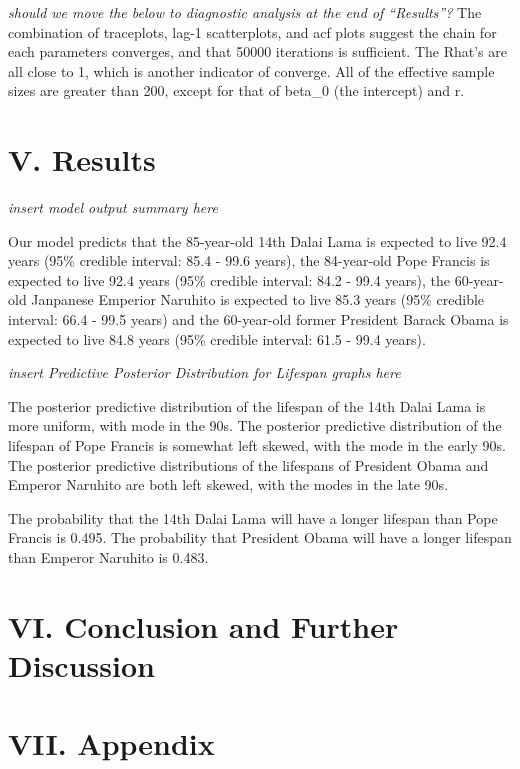 \documentclass[
]{article}
\begin{document}
\emph{should we move the below to diagnostic analysis at the end of
``Results''?} The combination of traceplots, lag-1 scatterplots, and acf
plots suggest the chain for each parameters converges, and that 50000
iterations is sufficient. The Rhat's are all close to 1, which is
another indicator of converge. All of the effective sample sizes are
greater than 200, except for that of beta\_0 (the intercept) and r.

\hypertarget{v.-results}{%
\section{V. Results}\label{v.-results}}

\emph{insert model output summary here}

Our model predicts that the 85-year-old 14th Dalai Lama is expected to
live 92.4 years (95\% credible interval: 85.4 - 99.6 years), the
84-year-old Pope Francis is expected to live 92.4 years (95\% credible
interval: 84.2 - 99.4 years), the 60-year-old Janpanese Emperior
Naruhito is expected to live 85.3 years (95\% credible interval: 66.4 -
99.5 years) and the 60-year-old former President Barack Obama is
expected to live 84.8 years (95\% credible interval: 61.5 - 99.4 years).

\emph{insert Predictive Posterior Distribution for Lifespan graphs here}

The posterior predictive distribution of the lifespan of the 14th Dalai
Lama is more uniform, with mode in the 90s. The posterior predictive
distribution of the lifespan of Pope Francis is somewhat left skewed,
with the mode in the early 90s. The posterior predictive distributions
of the lifespans of President Obama and Emperor Naruhito are both left
skewed, with the modes in the late 90s.

The probability that the 14th Dalai Lama will have a longer lifespan
than Pope Francis is 0.495. The probability that President Obama will
have a longer lifespan than Emperor Naruhito is 0.483.

\hypertarget{vi.-conclusion-and-further-discussion}{%
\section{VI. Conclusion and Further
Discussion}\label{vi.-conclusion-and-further-discussion}}

\hypertarget{vii.-appendix}{%
\section{VII. Appendix}\label{vii.-appendix}}
\end{document}
